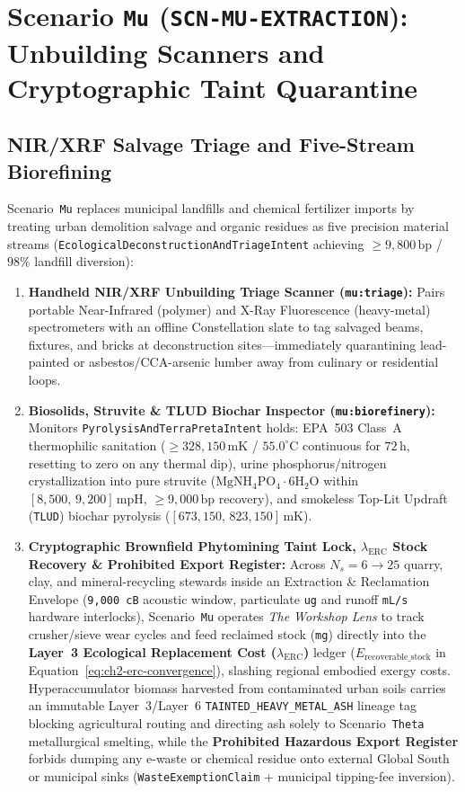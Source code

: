 \section{Scenario \texttt{Mu} (\texttt{SCN-MU-EXTRACTION}): Unbuilding Scanners and Cryptographic Taint Quarantine}
\label{sec:wave-d-mu}

\subsection{NIR/XRF Salvage Triage and Five-Stream Biorefining}

Scenario~\texttt{Mu} replaces municipal landfills and chemical fertilizer imports by treating urban demolition salvage and organic residues as five precision material streams (\texttt{EcologicalDeconstructionAndTriageIntent} achieving $\ge 9{,}800\,\mathrm{bp}$ / $98\%$ landfill diversion):
\begin{enumerate}
    \item \textbf{Handheld NIR/XRF Unbuilding Triage Scanner (\texttt{mu:triage}):} Pairs portable Near-Infrared (polymer) and X-Ray Fluorescence (heavy-metal) spectrometers with an offline Constellation slate to tag salvaged beams, fixtures, and bricks at deconstruction sites---immediately quarantining lead-painted or asbestos/CCA-arsenic lumber away from culinary or residential loops.
    \item \textbf{Biosolids, Struvite \& TLUD Biochar Inspector (\texttt{mu:biorefinery}):} Monitors \texttt{PyrolysisAndTerraPretaIntent} holds: EPA~503 Class~A thermophilic sanitation ($\ge 328{,}150\,\mathrm{mK}$ / $55.0^\circ\mathrm{C}$ continuous for $72\,\mathrm{h}$, resetting to zero on any thermal dip), urine phosphorus/nitrogen crystallization into pure struvite ($\mathrm{MgNH_4PO_4 \cdot 6H_2O}$ within $[8{,}500,\, 9{,}200]\,\mathrm{mpH}$, $\ge 9{,}000\,\mathrm{bp}$ recovery), and smokeless Top-Lit Updraft (\texttt{TLUD}) biochar pyrolysis ($[673{,}150,\, 823{,}150]\,\mathrm{mK}$).
    \item \textbf{Cryptographic Brownfield Phytomining Taint Lock, $\lambda_{\mathrm{ERC}}$ Stock Recovery \& Prohibited Export Register:} Across $N_s = 6 \to 25$ quarry, clay, and mineral-recycling stewards inside an Extraction \& Reclamation Envelope (\texttt{9,000 cB} acoustic window, particulate \texttt{ug} and runoff \texttt{mL/s} hardware interlocks), Scenario~\texttt{Mu} operates \textit{The Workshop Lens} to track crusher/sieve wear cycles and feed reclaimed stock (\texttt{mg}) directly into the \textbf{Layer~3 Ecological Replacement Cost ($\lambda_{\mathrm{ERC}}$)} ledger ($E_{\mathrm{recoverable\_stock}}$ in Equation~\ref{eq:ch2-erc-convergence}), slashing regional embodied exergy costs. Hyperaccumulator biomass harvested from contaminated urban soils carries an immutable Layer~3/Layer~6 \texttt{TAINTED\_HEAVY\_METAL\_ASH} lineage tag blocking agricultural routing and directing ash solely to Scenario~\texttt{Theta} metallurgical smelting, while the \textbf{Prohibited Hazardous Export Register} forbids dumping any e-waste or chemical residue onto external Global South or municipal sinks (\texttt{WasteExemptionClaim} + municipal tipping-fee inversion).
\end{enumerate}

